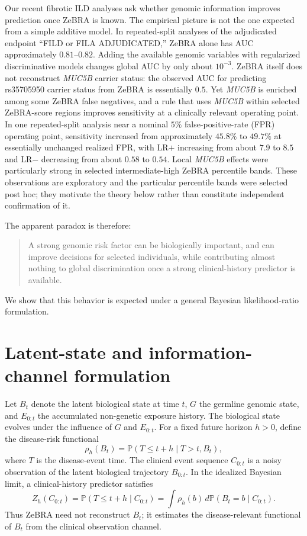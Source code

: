 \documentclass[journal]{IEEEtran}
\begin{document}
Our recent fibrotic ILD analyses ask whether genomic information improves prediction once ZeBRA is known. The empirical picture is not the one expected from a simple additive model. In repeated-split analyses of the adjudicated endpoint ``FILD or FILA ADJUDICATED,'' ZeBRA alone has AUC approximately $0.81$--$0.82$. Adding the available genomic variables with regularized discriminative models changes global AUC by only about $10^{-3}$. ZeBRA itself does not reconstruct \textit{MUC5B} carrier status: the observed AUC for predicting rs35705950 carrier status from ZeBRA is essentially $0.5$. Yet \textit{MUC5B} is enriched among some ZeBRA false negatives, and a rule that uses \textit{MUC5B} within selected ZeBRA-score regions improves sensitivity at a clinically relevant operating point. In one repeated-split analysis near a nominal $5\%$ false-positive-rate (FPR) operating point, sensitivity increased from approximately $45.8\%$ to $49.7\%$ at essentially unchanged realized FPR, with LR$+$ increasing from about $7.9$ to $8.5$ and LR$-$ decreasing from about $0.58$ to $0.54$. Local \textit{MUC5B} effects were particularly strong in selected intermediate-high ZeBRA percentile bands. These observations are exploratory and the particular percentile bands were selected post hoc; they motivate the theory below rather than constitute independent confirmation of it.

The apparent paradox is therefore:
\begin{quote}
A strong genomic risk factor can be biologically important, and can improve decisions for selected individuals, while contributing almost nothing to global discrimination once a strong clinical-history predictor is available.
\end{quote}

We show that this behavior is expected under a general Bayesian likelihood-ratio formulation.

\section{Latent-state and information-channel formulation}

Let $B_t$ denote the latent biological state at time $t$, $G$ the germline genomic state, and $E_{0:t}$ the accumulated non-genetic exposure history. The biological state evolves under the influence of $G$ and $E_{0:t}$. For a fixed future horizon $h>0$, define the disease-risk functional
\begin{equation}
\rho_h(B_t)
=\mathbb{P}(T\le t+h\mid T>t,B_t),
\label{eq:rho}
\end{equation}
where $T$ is the disease-event time. The clinical event sequence $C_{0:t}$ is a noisy observation of the latent biological trajectory $B_{0:t}$. In the idealized Bayesian limit, a clinical-history predictor satisfies
\begin{equation}
Z_h(C_{0:t})
=\mathbb{P}(T\le t+h\mid C_{0:t})
=\int \rho_h(b)\,d\mathbb{P}(B_t=b\mid C_{0:t}).
\label{eq:zposterior}
\end{equation}
Thus ZeBRA need not reconstruct $B_t$; it estimates the disease-relevant functional of $B_t$ from the clinical observation channel.
\end{document}
